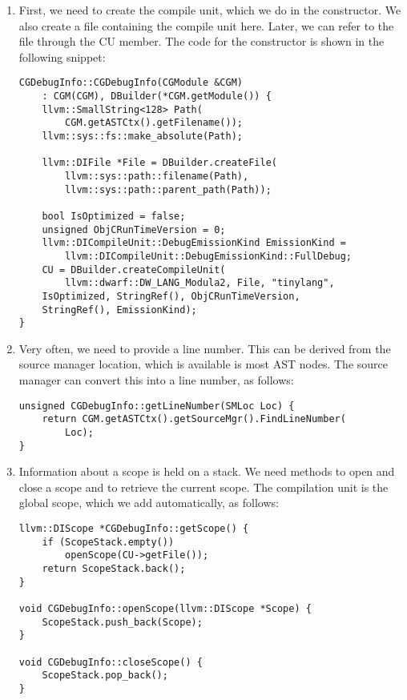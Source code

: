 \begin{enumerate}
\item First, we need to create the compile unit, which we do in the constructor. We also create a file containing the compile unit here. Later, we can refer to the file through the CU member. The code for the constructor is shown in the following snippet:
\begin{lstlisting}[caption={}]
CGDebugInfo::CGDebugInfo(CGModule &CGM)
	: CGM(CGM), DBuilder(*CGM.getModule()) {
	llvm::SmallString<128> Path(
		CGM.getASTCtx().getFilename());
	llvm::sys::fs::make_absolute(Path);
	
	llvm::DIFile *File = DBuilder.createFile(
		llvm::sys::path::filename(Path),
		llvm::sys::path::parent_path(Path));
		
	bool IsOptimized = false;
	unsigned ObjCRunTimeVersion = 0;
	llvm::DICompileUnit::DebugEmissionKind EmissionKind =
		llvm::DICompileUnit::DebugEmissionKind::FullDebug;
	CU = DBuilder.createCompileUnit(
		llvm::dwarf::DW_LANG_Modula2, File, "tinylang",
	IsOptimized, StringRef(), ObjCRunTimeVersion,
	StringRef(), EmissionKind);
}
\end{lstlisting}

\item Very often, we need to provide a line number. This can be derived from the source manager location, which is available is most AST nodes. The source manager can convert this into a line number, as follows:
\begin{lstlisting}[caption={}]
unsigned CGDebugInfo::getLineNumber(SMLoc Loc) {
	return CGM.getASTCtx().getSourceMgr().FindLineNumber(
		Loc);
}
\end{lstlisting}

\item Information about a scope is held on a stack. We need methods to open and close a scope and to retrieve the current scope. The compilation unit is the global scope, which we add automatically, as follows:
\begin{lstlisting}[caption={}]
llvm::DIScope *CGDebugInfo::getScope() {
	if (ScopeStack.empty())
		openScope(CU->getFile());
	return ScopeStack.back();
}

void CGDebugInfo::openScope(llvm::DIScope *Scope) {
	ScopeStack.push_back(Scope);
}

void CGDebugInfo::closeScope() {
	ScopeStack.pop_back();
}
\end{lstlisting}


\end{enumerate}
